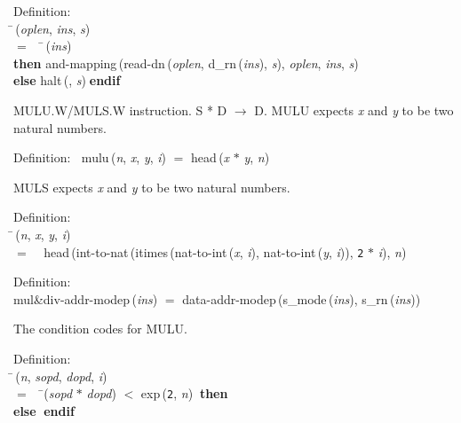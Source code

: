 \begin{tabbing}{\sc Definition}: \\  
\=\,({\it{oplen\/}}, {\it{ins\/}}, {\it{s\/}}) \\ 
$=$$\;\;\;\;$\=\,({\it{ins\/}}) \\ 
{\bf then }{\rm{and-mapping}}\,({\rm{read-dn}}\,({\it{oplen\/}}, {\rm{d\_rn}}\,({\it{ins\/}}), {\it{s\/}}), {\it{oplen\/}}, {\it{ins\/}}, {\it{s\/}}) \\ 
{\bf else }{\rm{halt}}\,({}, {\it{s\/}})$\;${\bf  endif}\-\-
\end{tabbing}

 MULU.W/MULS.W instruction.  S * D $\rightarrow$ D.
 MULU expects {\it{x\/}} and {\it{y\/}} to be two natural numbers.
\begin{tabbing}{\sc Definition}:$\;\;$
{\rm{mulu}}\,({\it{n\/}}, {\it{x\/}}, {\it{y\/}}, {\it{i\/}}) $=$ {\rm{head}}\,({\it{x\/}} $*$ {\it{y\/}}, {\it{n\/}})
\end{tabbing}

 MULS expects {\it{x\/}} and {\it{y\/}} to be two natural numbers.
\begin{tabbing}{\sc Definition}: \\  
\=\,({\it{n\/}}, {\it{x\/}}, {\it{y\/}}, {\it{i\/}}) \\ 
$=$$\;\;\;\;${\rm{head}}\,({\rm{int-to-nat}}\,({\rm{itimes}}\,({\rm{nat-to-int}}\,({\it{x\/}}, {\it{i\/}}), {\rm{nat-to-int}}\,({\it{y\/}}, {\it{i\/}})), {\tt{2}} $*$ {\it{i\/}}), {\it{n\/}})\-
\end{tabbing}

\begin{tabbing}{\sc Definition}: \\  
{\rm{mul\&div-addr-modep}}\,({\it{ins\/}}) $=$ {\rm{data-addr-modep}}\,({\rm{s\_mode}}\,({\it{ins\/}}), {\rm{s\_rn}}\,({\it{ins\/}}))
\end{tabbing}

 The condition codes for MULU.
\begin{tabbing}{\sc Definition}: \\  
\=\,({\it{n\/}}, {\it{sopd\/}}, {\it{dopd\/}}, {\it{i\/}}) \\ 
$=$$\;\;\;\;$\=({\it{sopd\/}} $*$ {\it{dopd\/}}) $<$ {\rm{exp}}\,({\tt{2}}, {\it{n\/}})$\;\;${\bf then }{} \\ 
{\bf else }{}$\;${\bf  endif}\-\-
\end{tabbing}

